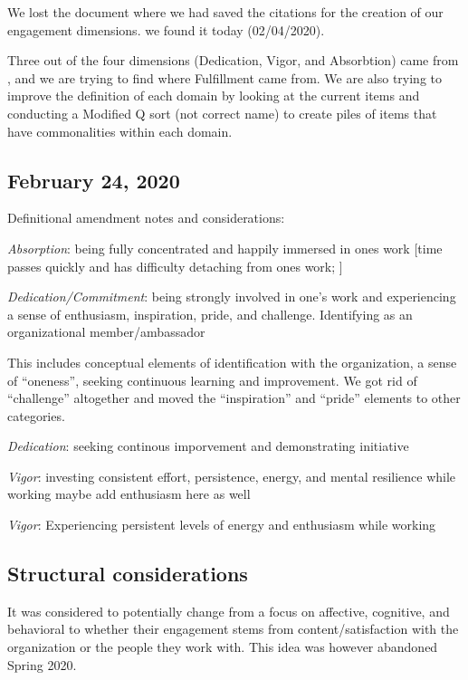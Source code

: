 \documentclass[
]{book}
\begin{document}
We lost the document where we had saved the citations for the creation of our engagement dimensions. we found it today (02/04/2020).

Three out of the four dimensions (Dedication, Vigor, and Absorbtion) came from \citet{schaufeli_measurement_2002}, and we are trying to find where Fulfillment came from. We are also trying to improve the definition of each domain by looking at the current items and conducting a Modified Q sort (not correct name) to create piles of items that have commonalities within each domain.

\hypertarget{february-24-2020}{%
\subsection{February 24, 2020}\label{february-24-2020}}

Definitional amendment notes and considerations:

\emph{Absorption}: being fully concentrated and happily immersed in ones work {[}time passes quickly and has difficulty detaching from ones work; \citet{schaufeli_measurement_2002}{]}

\emph{Dedication/Commitment}: being strongly involved in one's work and experiencing a sense of enthusiasm, inspiration, pride, and challenge. \citep{schaufeli_measurement_2002} Identifying as an organizational member/ambassador

This includes conceptual elements of identification with the organization, a sense of ``oneness'', seeking continuous learning and improvement. We got rid of ``challenge'' altogether and moved the ``inspiration'' and ``pride'' elements to other categories.

\emph{Dedication}: seeking continous imporvement and demonstrating initiative

\emph{Vigor}: investing consistent effort, persistence, energy, and mental resilience while working \citep{schaufeli_measurement_2002} maybe add enthusiasm here as well

\emph{Vigor}: Experiencing persistent levels of energy and enthusiasm while working

\hypertarget{structural-considerations}{%
\subsection{Structural considerations}\label{structural-considerations}}

It was considered to potentially change from a focus on affective, cognitive, and behavioral to whether their engagement stems from content/satisfaction with the organization or the people they work with. This idea was however abandoned Spring 2020.
\end{document}
